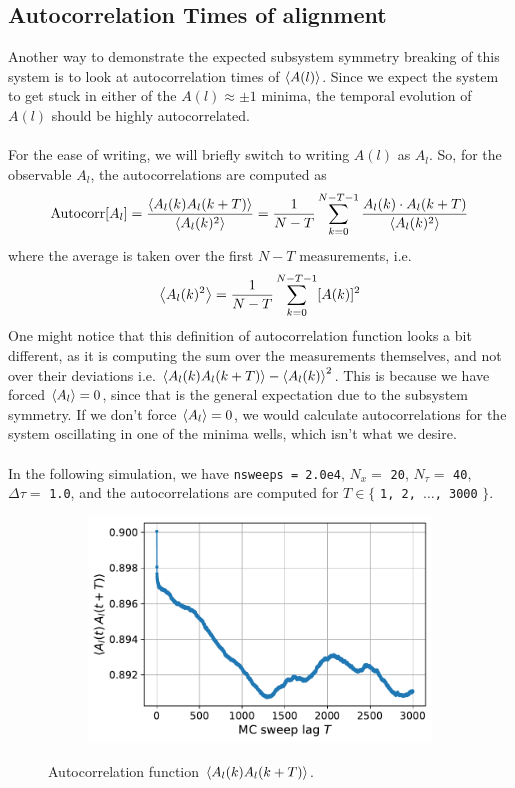 \documentclass[../thesis_main.tex]{subfiles}
\begin{document}
\subsection{Autocorrelation Times of alignment}
Another way to demonstrate the expected subsystem symmetry breaking of this system is to look at autocorrelation times of $\expval{A(l)}$. Since we expect the system to get stuck in either of the $A(l) \approx \pm 1$ minima, the temporal evolution of $A(l)$ should be highly autocorrelated.~\\~\\
For the ease of writing, we will briefly switch to writing $A(l)$ as $A_l$. So, for the observable $A_l$, the autocorrelations are computed as 
\begin{equation}
    \text{Autocorr}[A_l] = \frac{\expval{A_l(k) A_l(k+T)}}{\expval{A_l(k)^2}} = \frac{1}{N-T} \sum_{k=0}^{N-T-1} \frac{A_l(k) \cdot A_l(k+T)}{\expval{A_l(k)^2}}
\end{equation} 
where the average is taken over the first $N-T$ measurements, i.e.
\[
    \expval{A_l(k)^2} = \frac{1}{N-T} \sum_{k=0}^{N-T-1} [A(k)]^2
\] 
One might notice that this definition of autocorrelation function looks a bit different, as it is computing the sum over the measurements themselves, and not over their deviations i.e. $\expval{A_l(k) A_l(k+T)} - \expval{A_l(k)}^2$. This is because we have forced $\expval{A_l} = 0$, since that is the general expectation due to the subsystem symmetry. If we don't force $\expval{A_l} = 0$, we would calculate autocorrelations for the system oscillating in one of the minima wells, which isn't what we desire.~\\~\\
In the following simulation, we have \texttt{nsweeps = 2.0e4}, $N_x = $ \texttt{20}, $N_\tau = $ \texttt{40}, $\Delta \tau = $ \texttt{1.0}, and the autocorrelations are computed for $T \in \{ $ \texttt{1, 2, $\ldots$, 3000} $\}$.       

\begin{figure}[!htb]
    \centering
    \begin{subfigure}[b]{0.5\textwidth}
        \centering
        \includegraphics[width=\textwidth]{images/misc/autocorrfn_singlet.pdf}
    \end{subfigure}
    \caption{Autocorrelation function $\expval{A_l(k) A_l(k+T)}$.}
    \label{autocorrs_singlet}
\end{figure}
\FloatBarrier
\end{document}
